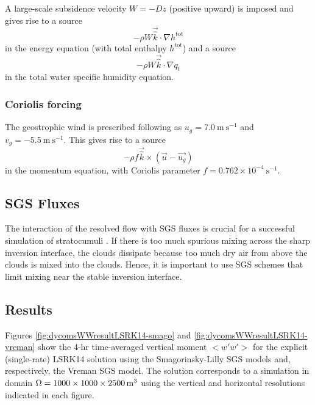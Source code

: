 \documentclass{report}
\begin{document}
A large-scale subsidence velocity $W=-Dz$ (positive upward) is imposed and gives rise to a source
\[
-\rho W \vec{\hat k} \cdot \nabla h^\mathrm{tot}
\]
in the energy equation (with total enthalpy $h^\mathrm{tot}$) and a source
\[
-\rho W \vec{\hat k} \cdot \nabla q_t
\]
in the total water specific humidity equation.

\subsubsection{Coriolis forcing}

The geostrophic wind is prescribed following \cite{Stevens05a} as $u_g = 7.0~\mathrm{m~s^{-1}}$ and $v_g = -5.5~\mathrm{m~s^{-1}}$. This gives rise to a source
\[
-\rho f\vec{\hat k} \times (\vec{u}-\vec{u_g})
\]
in the momentum equation, with Coriolis parameter $f = 0.762\times10^{-4}~\mathrm{s^{-1}}$.

\subsection{SGS Fluxes}

The interaction of the resolved flow with SGS fluxes is crucial for a successful simulation of stratocumuli \citep{Pressel17a}. If there is too much spurious mixing across the sharp inversion interface, the clouds dissipate because too much dry air from above the clouds is mixed into the clouds. Hence, it is important to use SGS schemes that limit mixing near the stable inversion interface.

\subsection{Results}
Figures \ref{fig:dycomsWWresultLSRK14-smago} and \ref{fig:dycomsWWresultLSRK14-vreman} show the 4-hr time-averaged vertical moment $<w'w'>$ for the explicit (single-rate) LSRK14 solution using the Smagorinsky-Lilly SGS models and, respectively, the Vreman SGS model. The solution corresponds to a simulation in domain $\Omega=1000\times 1000 \times 2500\,{\rm m^3}$ using the vertical and horizontal resolutions indicated in each figure. 
\end{document}
